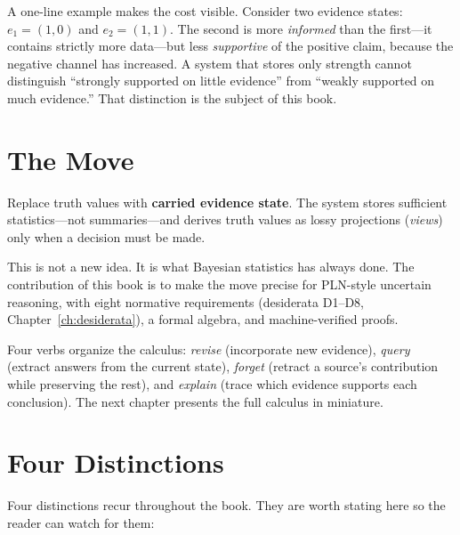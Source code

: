 \documentclass[11pt,openany]{report}
\begin{document}
A one-line example makes the cost visible.  Consider two evidence
states: $e_1 = (1, 0)$ and $e_2 = (1, 1)$.  The second is more
\emph{informed} than the first---it contains strictly more
data---but less \emph{supportive} of the positive claim, because
the negative channel has increased.  A system that stores only
strength cannot distinguish ``strongly supported on little
evidence'' from ``weakly supported on much evidence.''  That
distinction is the subject of this book.


\section{The Move}

Replace truth values with \textbf{carried evidence state}.
The system stores sufficient statistics---not summaries---and
derives truth values as lossy projections (\emph{views}) only
when a decision must be made.

This is not a new idea.  It is what Bayesian statistics has always
done.  The contribution of this book is to make the move precise
for PLN-style uncertain reasoning, with eight normative
requirements (desiderata D1--D8, Chapter~\ref{ch:desiderata}),
a formal algebra, and machine-verified proofs.

Four verbs organize the calculus: \emph{revise} (incorporate new
evidence), \emph{query} (extract answers from the current state),
\emph{forget} (retract a source's contribution while preserving
the rest), and \emph{explain} (trace which evidence supports each
conclusion).  The next chapter presents the full calculus in
miniature.


\section{Four Distinctions}

Four distinctions recur throughout the book.  They are worth
stating here so the reader can watch for them:
\end{document}
